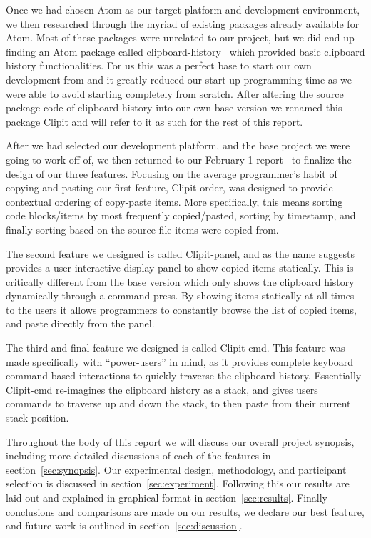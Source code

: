 \documentclass{acm_proc_article-sp}
\begin{document}
Once we had chosen Atom as our target platform and development environment, we then researched through the myriad of existing packages already available for Atom. Most of these packages were unrelated to our project, but we did end up finding an Atom package called clipboard-history~\cite{Atom_C_History} which provided basic clipboard history functionalities. For us this was a perfect base to start our own development from and it greatly reduced our start up programming time as we were able to avoid starting completely from scratch. After altering the source package code of clipboard-history into our own base version we renamed this package Clipit and will refer to it as such for the rest of this report.

After we had selected our development platform, and the base project we were going to work off of, we then returned to our February 1 report~\cite{janReport} to finalize the design of our three features. Focusing on the average programmer's habit of copying and pasting our first feature, Clipit-order, was designed to provide contextual ordering of copy-paste items. More specifically, this means sorting code blocks/items by most frequently copied/pasted, sorting by timestamp, and finally sorting based on the source file items were copied from.

The second feature we designed is called Clipit-panel, and as the name suggests provides a user interactive display panel to show copied items statically. This is critically different from the base version which only shows the clipboard history dynamically through a command press. By showing items statically at all times to the users it allows programmers to constantly browse the list of copied items, and paste directly from the panel.

The third and final feature we designed is called Clipit-cmd. This feature was made specifically with ``power-users'' in mind, as it provides complete keyboard command based interactions to quickly traverse the clipboard history. Essentially Clipit-cmd re-imagines the clipboard history as a stack, and gives users commands to traverse up and down the stack, to then paste from their current stack position.
 
Throughout the body of this report we will discuss our overall project synopsis, including more detailed discussions of each of the features in section~\ref{sec:synopsis}. Our experimental design, methodology, and participant selection is discussed in section~\ref{sec:experiment}. Following this our results are laid out and explained in graphical format in section~\ref{sec:results}. Finally conclusions and comparisons are made on our results, we declare our best feature, and future work is outlined in section~\ref{sec:discussion}.
\end{document}

